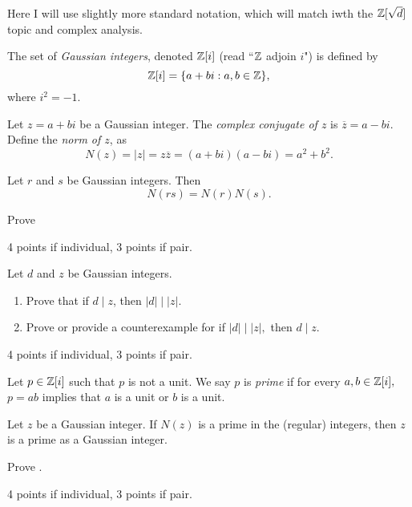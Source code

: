 \documentclass[letterpaper, 11 pt,handout]{ximera}
\begin{document}
\begin{exploration}
Here I will use slightly more standard notation, which will match iwth the $\mathbb Z[\sqrt{d}]$ topic and complex analysis.
 	\begin{definition}
 		The set of \emph{Gaussian integers}, denoted $\mathbb Z[i]$ (read ``$\mathbb Z$ adjoin $i$") is defined by 
 \[\mathbb Z[i]=\{a+bi : a,b\in\mathbb Z\},\]
 where $i^2=-1$.
 
 	Let $z=a+bi$ be a Gaussian integer. The \emph{complex  conjugate of $z$} is $\overline{z}=a-bi$. Define the \emph{norm of $z$}, as
 \[N(z)=|z|=z\overline{z}=(a+bi)(a-bi)=a^2+b^2.\]
	\end{definition}

\begin{lem*}[Lemma 13.1.4]\label{norm-mult}
 	Let $r$ and $s$ be Gaussian integers. Then 
 		\[N(rs)=N(r)N(s).\]
 \end{lem*}

\begin{problem}
Prove 
	\begin{rubric}
 		4 points if individual, 3 points if pair.
	\end{rubric}
\end{problem}

\begin{problem}
Let $d$ and $z$ be Gaussian integers. 
\begin{enumerate}
	\item Prove that if $d\mid z$, then $|d|\mid |z|$.
		\item Prove or provide a counterexample for if $|d|\mid |z|,$ then $d\mid z.$ 
\end{enumerate}
	\begin{rubric}
 		4 points if individual, 3 points if pair.
	\end{rubric}
\end{problem}

\begin{definition}
 Let $p\in\mathbb Z[i]$ such that $p$ is not a unit. We say $p$ is \emph{prime} if for every $a,b\in\mathbb Z[i],$ $p=ab$ implies that $a$ is a unit or $b$ is a unit.
\end{definition}

\begin{lem*}[Lemma 13.2.6]\label{prime_norm}
 Let $z$ be a Gaussian integer. If $N(z)$ is a prime in the (regular) integers, then $z$ is a prime as a Gaussian integer.
\end{lem*}

\begin{problem}
Prove .
	\begin{rubric}
 		4 points if individual, 3 points if pair.
	\end{rubric}
\end{problem}




\end{exploration}
\end{document}
